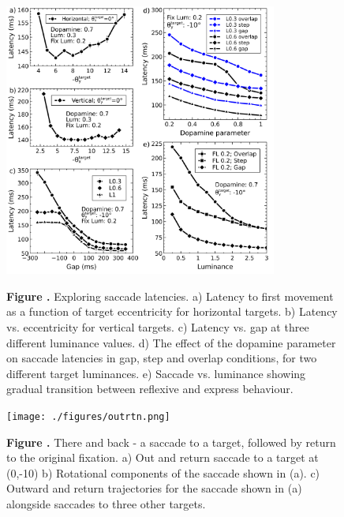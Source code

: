 \documentclass{frontiersSCNS}
\begin{document}
\begin{figure}[htb!]
\begin{center}
\includegraphics[width=0.8\textwidth]{./figures/lat_vs_everything.png}
\end{center}
\textbf{\label{lat_vs_all} Figure .}
{ Exploring saccade latencies. a) Latency to first movement as a
function of target eccentricity for horizontal targets. b) Latency
vs. eccentricity for vertical targets. c) Latency vs. gap at three
different luminance values. d) The effect of the dopamine parameter on
saccade latencies in gap, step and overlap conditions, for two
different target luminances.  e) Saccade vs. luminance showing gradual
transition between reflexive and express behaviour.
}
\end{figure}

\begin{figure}[htb!]
\begin{center}
\texttt{[image: ./figures/outrtn.png]}
\end{center}
\textbf{\label{outrtn} Figure .}
{ There and back - a saccade to a target, followed by return to the
original fixation. a) Out and return saccade to a target at (0,-10\dg)
b) Rotational components of the saccade shown in (a). c) Outward and
return trajectories for the saccade shown in (a) alongside saccades to
three other targets.}
\end{figure}
\end{document}
